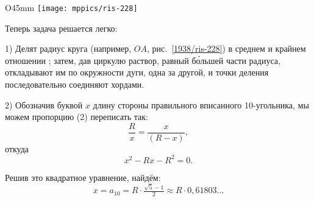 \begin{wrapfigure}{O}{45mm}
\centering
\texttt{[image: mppics/ris-228]}
\caption{}\label{1938/ris-228}
\end{wrapfigure}

Теперь задача решается легко:

1) Делят радиус круга (например, $OA$, рис.~\ref{1938/ris-228}) в среднем и крайнем отношении%
;
затем, дав циркулю раствор, равный б\'{о}льшей части радиуса, откладывают им по окружности дуги, одна за другой, и точки деления последовательно соединяют хордами.

2) Обозначив буквой $x$ длину стороны правильного вписанного 10-угольника, мы можем пропорцию (2) переписать так:
\[\frac Rx=\frac x{(R-x)},\]
откуда
\[x^2-Rx-R^2=0.\]

Решив это квадратное уравнение, найдём:
\[x=a_{10}=R\cdot\tfrac{\sqrt5-1}{2}\approx R \cdot  0{,}61803\dots\]

